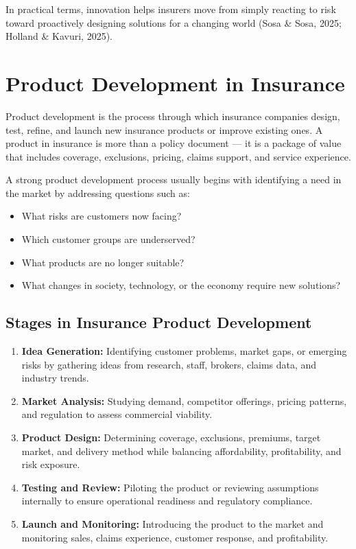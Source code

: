 \documentclass[12pt,a4paper]{article}
\begin{document}
In practical terms, innovation helps insurers move from simply reacting to risk toward proactively designing solutions for a changing world (Sosa \& Sosa, 2025; Holland \& Kavuri, 2025).

\section{Product Development in Insurance}

Product development is the process through which insurance companies design, test, refine, and launch new insurance products or improve existing ones. A product in insurance is more than a policy document --- it is a package of value that includes coverage, exclusions, pricing, claims support, and service experience.

A strong product development process usually begins with identifying a need in the market by addressing questions such as:
\begin{itemize}
    \item What risks are customers now facing?
    \item Which customer groups are underserved?
    \item What products are no longer suitable?
    \item What changes in society, technology, or the economy require new solutions?
\end{itemize}

\subsection{Stages in Insurance Product Development}
\begin{enumerate}
    \item \textbf{Idea Generation:} Identifying customer problems, market gaps, or emerging risks by gathering ideas from research, staff, brokers, claims data, and industry trends.
    \item \textbf{Market Analysis:} Studying demand, competitor offerings, pricing patterns, and regulation to assess commercial viability.
    \item \textbf{Product Design:} Determining coverage, exclusions, premiums, target market, and delivery method while balancing affordability, profitability, and risk exposure.
    \item \textbf{Testing and Review:} Piloting the product or reviewing assumptions internally to ensure operational readiness and regulatory compliance.
    \item \textbf{Launch and Monitoring:} Introducing the product to the market and monitoring sales, claims experience, customer response, and profitability.
\end{enumerate}
\end{document}
